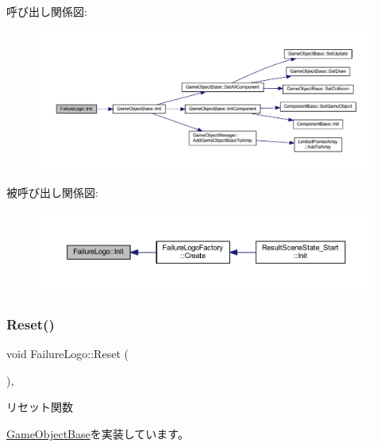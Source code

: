呼び出し関係図\+:\nopagebreak
\begin{figure}[H]
\begin{center}
\leavevmode
\includegraphics[width=350pt]{class_failure_logo_a22da89def55023f43860cf646da7a74c_cgraph}
\end{center}
\end{figure}
被呼び出し関係図\+:\nopagebreak
\begin{figure}[H]
\begin{center}
\leavevmode
\includegraphics[width=350pt]{class_failure_logo_a22da89def55023f43860cf646da7a74c_icgraph}
\end{center}
\end{figure}
\mbox{\label{class_failure_logo_a542b1617087a6701f7edb345e2a72e01}} 
\subsubsection{\texorpdfstring{Reset()}{Reset()}}
{\footnotesize\ttfamily void Failure\+Logo\+::\+Reset (\begin{DoxyParamCaption}{ }\end{DoxyParamCaption})\hspace{0.3cm}{\ttfamily [override]}, {\ttfamily [virtual]}}



リセット関数 



\mbox{\hyperlink{class_game_object_base_a85c59554f734bcb09f1a1e18d9517dce}{Game\+Object\+Base}}を実装しています。




